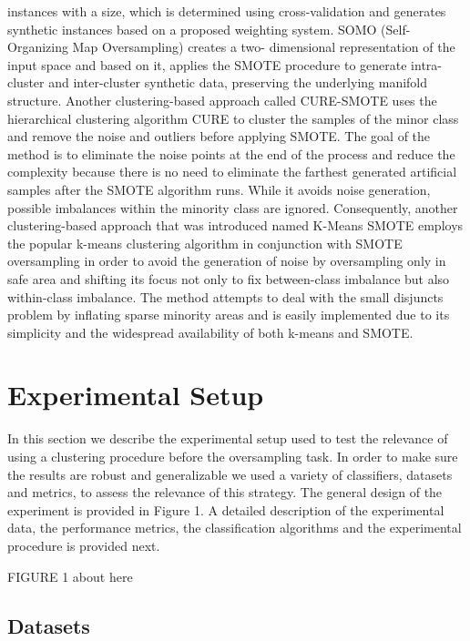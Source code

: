 \documentclass[parskip=full]{scrartcl}
\begin{document}
instances with a size, which is determined using cross-validation and generates 
synthetic instances based on a proposed weighting system.
SOMO (Self-Organizing Map Oversampling) \cite{Douzas2017a} creates a two- 
dimensional representation of the input space and based on it, applies the 
SMOTE procedure to generate intra-cluster and inter-cluster synthetic data, 
preserving the underlying manifold structure. Another clustering-based approach 
called CURE-SMOTE \cite{Ma2017} uses the hierarchical clustering algorithm CURE 
to cluster the samples of the minor class and remove the noise and outliers 
before applying SMOTE. The goal of the method is to eliminate the noise points 
at the end of the process and reduce the complexity because there is no need to 
eliminate the farthest generated artificial samples after the SMOTE algorithm 
runs. While it avoids noise generation, possible imbalances within the minority 
class are ignored. Consequently, another clustering-based approach that was 
introduced named K-Means SMOTE \cite{Douzas2018} employs the popular k-means 
clustering algorithm in conjunction with SMOTE oversampling in order to avoid 
the generation of noise by oversampling only in safe area and shifting its 
focus not only to fix between-class imbalance but also within-class imbalance. 
The method attempts to deal with the small disjuncts problem by inflating 
sparse minority areas and is easily implemented due to its simplicity and the 
widespread availability of both k-means and SMOTE.

\section{Experimental Setup}

In this section we describe the experimental setup used to test the relevance 
of using a clustering procedure before the oversampling task. In order to make 
sure the results are robust and generalizable we used a variety of classifiers, 
datasets and metrics, to assess the relevance of this strategy. The general 
design of the experiment is provided in Figure 1. A detailed description of the 
experimental data, the performance metrics, the classification algorithms and 
the experimental procedure is provided next.

FIGURE 1 about here

\subsection{Datasets} 
\end{document}
